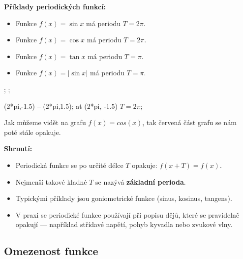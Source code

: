\documentclass[12pt,a4paper]{article}
\begin{document}
\begin{examplebox}
\textbf{Příklady periodických funkcí:}
\begin{itemize}
    \item Funkce \(f(x) = \sin x\) má periodu \(T = 2\pi\).
    \item Funkce \(f(x) = \cos x\) má periodu \(T = 2\pi\).
    \item Funkce \(f(x) = \tan x\) má periodu \(T = \pi\).
    \item Funkce \(f(x) = | \sin x |\) má periodu \(T = \pi\).
\end{itemize}
\begin{center}
\begin{axisgraph}[
    width=12cm,     %
    height=6cm,
    grid=minor,
    xmin=-3.5, xmax=13,
    ymin=-1.5, ymax=1.5,
    title={Periodická funkce $f(x) = \cos x$}
]
    ;
    ;
    
     (2*pi,-1.5) -- (2*pi,1.5);
     at (2*pi, -1.5) {$T = 2\pi$};
\end{axisgraph}
\end{center}
Jak můžeme vidět na grafu $f(x)=cos(x)$, tak červená část grafu se nám poté stále opakuje.
\end{examplebox}



\begin{notebox}
\textbf{Shrnutí:}
\begin{itemize}
    \item Periodická funkce se po určité délce \(T\) opakuje: \(f(x+T) = f(x)\).
    \item Nejmenší takové kladné \(T\) se nazývá \textbf{základní perioda}.
    \item Typickými příklady jsou goniometrické funkce (sinus, kosinus, tangens).
    \item V praxi se periodické funkce používají při popisu dějů, které se pravidelně opakují —  
          například střídavé napětí, pohyb kyvadla nebo zvukové vlny.
\end{itemize}
\end{notebox}


\subsection*{Omezenost funkce}
\end{document}
